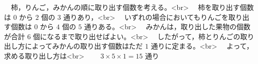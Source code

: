 　柿，りんご，みかんの順に取り出す個数を考える。<br>
　柿を取り出す個数は $0$ から $2$ 個の $3$ 通りあり，<br>
　いずれの場合においてもりんごを取り出す個数は $0$ から $4$ 個の $5$ 通りある。<br>
　みかんは，取り出した果物の個数が合計 $6$ 個になるまで取り出せばよい。<br>
　したがって，柿とりんごの取り出し方によってみかんの取り出す個数はただ $1$ 通りに定まる。<br>
　よって，求める取り出し方は<br>
　　$3 \times 5 \times 1 = 15$ 通り
